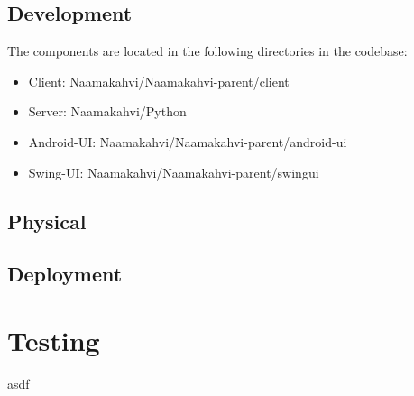 \documentclass[11pt]{article}
\begin{document}
\subsection{Development}

The components are located in the following directories in the codebase:
\begin{itemize}
\item Client: Naamakahvi/Naamakahvi-parent/client

\item Server: Naamakahvi/Python

\item Android-UI: Naamakahvi/Naamakahvi-parent/android-ui

\item Swing-UI: Naamakahvi/Naamakahvi-parent/swingui
\end{itemize}


\subsection{Physical}

\subsection{Deployment}

\section{Testing}
asdf
\end{document}

